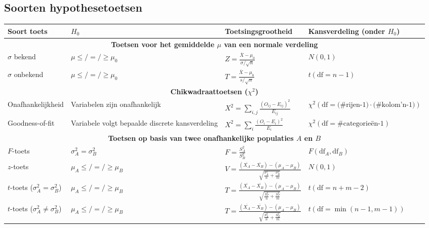\subsection*{Soorten hypothesetoetsen}
    \begin{table}[H]
        \centering
        \renewcommand{\arraystretch}{1.5}
        \begin{tabular}{m{}m{}m{}m{}}
            \toprule
                \textbf{Soort toets} & \textbf{$H_0$} & \textbf{Toetsingsgrootheid} & \textbf{Kansverdeling (onder $H_0$)} \\
            \midrule
                \multicolumn{4}{c}{\textbf{Toetsen voor het gemiddelde $\mu$ van een normale verdeling}} \\ 
            \midrule
                $\sigma$ bekend    & $\mu \leq/=/\geq \mu_0$ & $Z = \frac{\overline{X} - \mu_0}{\sigma / \sqrt{n}}$ & $N(0, 1)$ \\
                $\sigma$ onbekend  & $\mu \leq/=/\geq \mu_0$ & $T = \frac{\overline{X} - \mu_0}{s / \sqrt{n}}$ & $t(\text{df}=n-1)$ \\
            \midrule
                \multicolumn{4}{c}{\textbf{Chikwadraattoetsen ($\chi^2$)}} \\
            \midrule
                Onafhankelijkheid & Variabelen zijn \newline onafhankelijk & $X^2 = \sum_{i,j} \frac{(O_{ij} - E_{ij})^2}{E_{ij}}$ & $\chi^2(\text{df}=\text{(\#rijen-1)} \cdot \text{(\#kolom'n-1)})$ \\
                Goodness-of-fit & Variabele volgt bepaalde \newline discrete kansverdeling & $X^2 = \sum_{i} \frac{(O_{i} - E_{i})^2}{E_{i}}$ & $\chi^2(\text{df}=\text{\#categorieën-1})$ \\
            \midrule
                \multicolumn{4}{c}{\textbf{Toetsen op basis van twee onafhankelijke populaties $A$ en $B$}} \\
            \midrule
                $F$-toets & $\sigma_A^2 = \sigma_B^2$ & $F = \frac{S_A^2}{S_B^2}$ & $F(\text{df}_A, \text{df}_B)$ \\
                $z$-toets & $\mu_A \leq/=/\geq \mu_B$ & $V = \frac{(\overline{X_A} - \overline{X_B}) - (\mu_A - \mu_B)}{\sqrt{\frac{\sigma_A^2}{n} + \frac{\sigma_B^2}{m}}}$ & $N(0, 1)$ \\
                $t$-toets ($\sigma_A^2 = \sigma_B^2$) & $\mu_A \leq/=/\geq \mu_B$ & $T = \frac{(\overline{X_A} - \overline{X_B}) - (\mu_A - \mu_B)}{\sqrt{\frac{S_P^2}{n} + \frac{S_P^2}{m}}}$ & $t(\text{df}=n+m-2)$ \\
                $t$-toets ($\sigma_A^2 \neq \sigma_B^2$) & $\mu_A \leq/=/\geq \mu_B$ & $T = \frac{(\overline{X_A} - \overline{X_B}) - (\mu_A - \mu_B)}{\sqrt{\frac{S_A^2}{n} + \frac{S_B^2}{m}}}$ & $t(\text{df}=\min(n-1, m-1))$ \\
            \bottomrule
        \end{tabular}
    \end{table}


